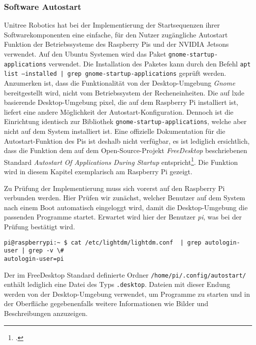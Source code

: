 \subsubsection{Software Autostart}
\label{subsubsec:software-autostart}

Unitree Robotics hat bei der Implementierung der Startsequenzen ihrer Softwarekomponenten eine einfache, für den Nutzer
zugängliche Autostart Funktion der Betriebssysteme des Raspberry Pis und der NVIDIA Jetsons verwendet.
Auf den Ubuntu Systemen wird das Paket \texttt{gnome\allowbreak -start\-up-\allowbreak app\-li\-cations} verwendet.
Die Installation des Paketes kann durch den Befehl \texttt{apt list --installed | grep gnome-\allowbreak start\-up-\allowbreak app\-li\-cations}
geprüft werden.
Anzumerken ist, dass die Funktionalität von der Desktop-Umgebung \emph{Gnome} bereitgestellt wird, nicht vom Betriebssystem
der Recheneinheiten.
Die auf \gls{lxde} basierende Desktop-Umgebung \gls{pixel}, die auf dem Raspberry Pi installiert ist, liefert eine andere
Möglichkeit der Autostart-Konfiguration.
Dennoch ist die Einrichtung identisch zur Bibliothek \texttt{gnome-\allowbreak start\-up-\allowbreak app\-li\-cations}, welche aber nicht auf dem System
installiert ist.
Eine offizielle Dokumentation für die Autostart-Funktion des Pis ist deshalb nicht verfügbar, es ist lediglich ersichtlich,
dass die Funktion dem auf dem Open-Source-Projekt \emph{FreeDesktop} beschriebenen Standard \emph{Autostart Of Applications During Startup}
entspricht\footcite{freedesktop_autostart}.
Die Funktion wird in diesem Kapitel exemplarisch am Raspberry Pi gezeigt.


Zu Prüfung der Implementierung muss sich vorerst auf den Raspberry Pi verbunden werden.
Hier Prüfen wir zunächst, welcher Benutzer auf dem System nach einem Boot automatisch eingeloggt wird, damit die
Desktop-Umgebung die passenden Programme startet.
Erwartet wird hier der Benutzer \emph{pi}, was bei der Prüfung bestätigt wird.

\begin{lstlisting}
pi@raspberrypi:~ $ cat /etc/lightdm/lightdm.conf  | grep autologin-user | grep -v \#
autologin-user=pi
\end{lstlisting}

\noindent Der im FreeDesktop Standard definierte Ordner \texttt{/home/pi/.config/autostart/} enthält lediglich eine Datei des Typs
\texttt{.desktop}.
Dateien mit dieser Endung werden von der Desktop-Umgebung verwendet, um Programme zu starten und in der Oberfläche
gegebenenfalls weitere Informationen wie Bilder und Beschreibungen anzuzeigen.

